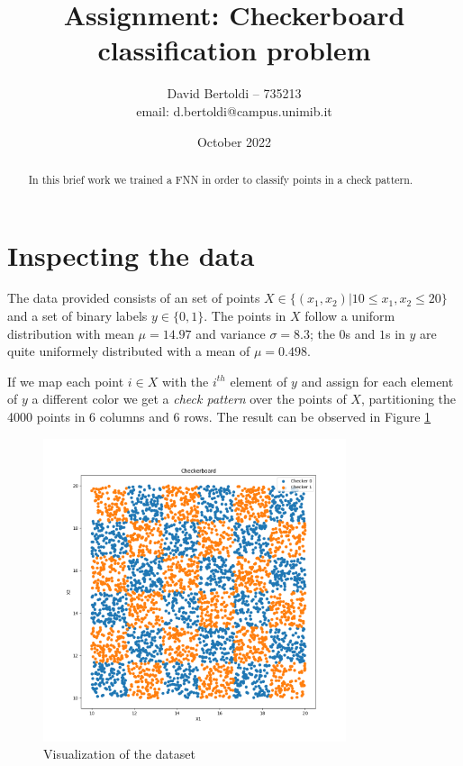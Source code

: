 \documentclass[compsoc]{IEEEtran}
\title{Assignment: Checkerboard classification problem}
\author{David Bertoldi -- 735213 \\ email: d.bertoldi@campus.unimib.it}
\affil{Department of Informatics, Systems and Communication}
\affil{University of Milano-Bicocca}
\date{October 2022}
\begin{document}
\maketitle 



\begin{abstract}
In this brief work we trained a FNN in order to classify points in a check pattern.
\end{abstract}



\section{Inspecting the data}
The data provided consists of an set of points $X \in \{(x_1, x_2) | 10 \leq x_1, x_2 \leq 20\}$ and a set of binary labels $y \in \{0, 1\}$.
The points in $X$ follow a uniform distribution with mean $\mu = 14.97$ and variance $\sigma = 8.3$; the $0$s and $1$s in $y$ are quite uniformely distributed with 
a mean of $\mu = 0.498$. \par
If we map each point $i \in X$ with the $i^{th}$ element of $y$ and assign for each element of $y$ a different color we get a \emph{check pattern} over the points of $X$, partitioning the 4000 points in 6 columns and 6 rows.
The result can be observed in Figure \ref{fig:checkerboard}

\begin{figure}[ht!]
\centering                                                                        
\includegraphics[width=3.5in]{../images/checkerboard.png}
\captionsetup{justification=centering}                                                                                                                                   
\caption{Visualization of the dataset}
\label{fig:checkerboard}                                                                                                                                                           
\end{figure}
\end{document}
